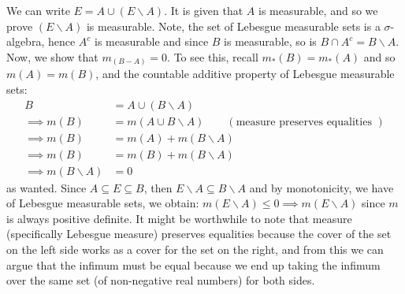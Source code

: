 \documentclass{article}
\begin{document}
    We can write $E = A \cup (E\backslash A)$. It is given that $A$ is measurable, and so we prove $(E\backslash A)$ is measurable.
    Note, the set of Lebesgue measurable sets is a $\sigma$-algebra, hence $A^c$ is measurable and since $B$ is measurable,
    so is $B\cap A^c = B\backslash A$. Now, we show that $m_(B-A) = 0$. To see this, recall $m_*(B) = m_*(A)$ and so
    $m(A) = m(B)$, and the countable additive property of Lebesgue measurable sets:
    \begin{align*}
        B &= A \cup (B\backslash A) \\
        \implies m(B) &= m(A\cup B\backslash A) \qquad(\text{measure preserves equalities })\\
        \implies m(B) &= m(A) + m(B\backslash A) \\
        \implies m(B) &= m(B) + m(B\backslash A) \\
        \implies m(B\backslash A) &= 0
    \end{align*}
    as wanted. Since $A\subseteq E\subseteq B$, then $E\backslash A\subseteq B\backslash A$ and by monotonicity, we have
    of Lebesgue measurable sets, we obtain: $m(E\backslash A) \leq 0 \implies m(E\backslash A)$ since $m$ is always
    positive definite. It might be worthwhile to note that measure (specifically Lebesgue measure) preserves equalities because
    the cover of the set on the left side works as a cover for the set on the right, and from this we can argue that the infimum
    must be equal because we end up taking the infimum over the same set (of non-negative real numbers) for both sides.
\end{document}
